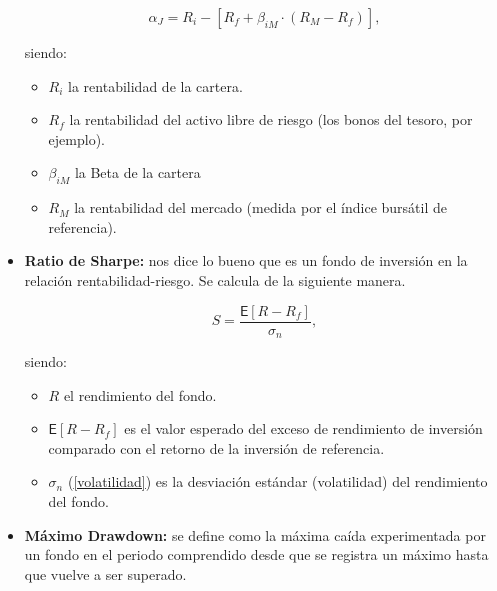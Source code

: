 \documentclass[12pt, a4paper]{book}
\begin{document}
\begin{itemize}
	\begin{center}
		\begin{equation}
		\alpha _{J}=R_{i}-[R_{f}+\beta _{{iM}}\cdot (R_{M}-R_{f})],
		\end{equation}
	\end{center}
	
	siendo: 
	\begin{itemize}
		\item $R_{i}$ la rentabilidad de la cartera.
		\item $R_{f}$ la rentabilidad del activo libre de riesgo (los bonos del tesoro, por ejemplo).
		\item $\beta _{{iM}} $ la Beta de la cartera
		\item $R_{M}$ la rentabilidad del mercado (medida por el índice bursátil de referencia).
	\end{itemize}
	
	 \newpage
	 
	\item \textbf{Ratio de Sharpe:} nos dice lo bueno que es un fondo de inversión en la relación rentabilidad-riesgo. Se calcula de la siguiente manera.
	
	\begin{center}
		\begin{equation}
		S={\frac {{\textsf {E}}[R-R_{f}]}{\sigma_n }},
		\end{equation}
	\end{center}
	
		siendo: 
	\begin{itemize}
		\item $R$ el rendimiento del fondo.
		\item ${\textsf {E}}[R-R_{f}]$ es el valor esperado del exceso de rendimiento de inversión comparado con el retorno de la inversión de referencia.
		\item $\sigma_n$  (\ref{volatilidad}) es la desviación estándar (volatilidad) del rendimiento del fondo.\\
		
	\end{itemize}
	
	\item \textbf{Máximo Drawdown:} se define como la máxima caída experimentada por un fondo en el periodo comprendido desde que se registra un máximo hasta que vuelve a ser superado.\\
	
\end{itemize}
\end{document}
